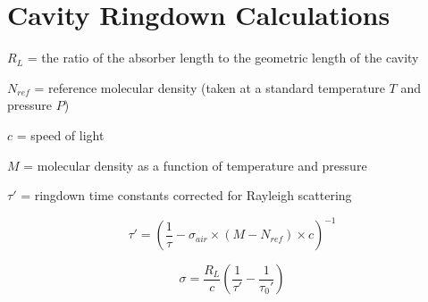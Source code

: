 \documentclass[12pt]{report}
\begin{document}
\section*{Cavity Ringdown Calculations}

\noindent $R_L$ = the ratio of the absorber length to the geometric length of the cavity

\noindent  $N_{ref}$ = reference molecular density (taken at a standard temperature $T$ and pressure $P$)

\noindent $c$ = speed of light

\noindent $M$ = molecular density as a function of temperature and pressure

\noindent $\tau'$ = ringdown time constants corrected for Rayleigh scattering


\begin{equation}
\tau'=\left(\frac{1}{\tau}-\sigma_{air}\times( M - N_{ref})\times c \right)^{-1}
\end{equation}

\begin{equation}
\sigma = \frac{R_L}{c}\left(\frac{1}{\tau'}-\frac{1}{\tau_0'}\right)
\end{equation}
\end{document}
